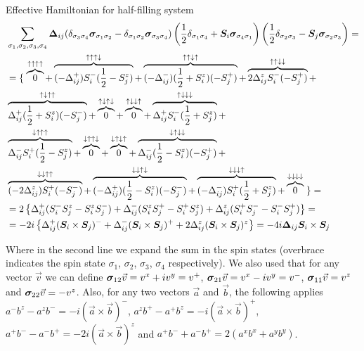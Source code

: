 \begin{section}{Effective Hamiltonian for half-filling system}
\begin{align*}
&\sum_{\sigma_1, \sigma_2, \sigma_3, \sigma_4}\boldsymbol{\Delta}_{ij}(\delta_{\sigma_3 \sigma_4}\boldsymbol{\sigma}_{\sigma_1 \sigma_2} - \delta_{\sigma_1 \sigma_2} \boldsymbol{\sigma}_{\sigma_3\sigma_4})\left(\frac{1}{2}\delta_{\sigma_1 \sigma_4} + \boldsymbol{S}_i\boldsymbol{\sigma}_{\sigma_4 \sigma_1}\right)\left(\frac{1}{2}\delta_{\sigma_2 \sigma_3}-\boldsymbol{S}_j\boldsymbol{\sigma}_{\sigma_2 \sigma_3}\right) = \\
 &= \left\{ \right.
	\overbrace{0}^{\uparrow \uparrow \uparrow \uparrow} +
	\overbrace{(-\Delta_{ij}^+)S_i^-(\frac{1}{2}-S_j^z)}^{\uparrow \uparrow \uparrow \downarrow} +
	\overbrace{(-\Delta_{ij}^-)(\frac{1}{2}+ S_i^z)(-S_j^+)}^{\uparrow \uparrow \downarrow \uparrow} +
	\overbrace{2\Delta_{ij}^z S_i^-(-S_j^+)}^{\uparrow \uparrow \downarrow \downarrow} + \\
	&\overbrace{\Delta_{ij}^+ (\frac{1}{2}+S_i^z)(-S_j^-)}^{\uparrow \downarrow \uparrow \uparrow} +
	\overbrace{0}^{\uparrow \downarrow \uparrow \downarrow} +
	\overbrace{0}^{\uparrow \downarrow \downarrow \uparrow} +
	\overbrace{\Delta_{ij}^+ S_i^-(\frac{1}{2}+S_j^z)}^{\uparrow \downarrow \downarrow \downarrow} + \\
	&\overbrace{\Delta_{ij}^- S_i^+(\frac{1}{2}-S_j^z)}^{\downarrow \uparrow \uparrow \uparrow} +
	\overbrace{0}^{\downarrow \uparrow \uparrow \downarrow} +
	\overbrace{0}^{\downarrow \uparrow \downarrow \uparrow} +
	\overbrace{\Delta_{ij}^- (\frac{1}{2} - S_i^z) (-S_j^+)}^{\downarrow \uparrow \downarrow \downarrow} + \\
	& \overbrace{(-2\Delta_{ij}^z)S_i^+(-S_j^-)}^{\downarrow \downarrow \uparrow \uparrow} +
	\overbrace{(-\Delta_{ij}^+) (\frac{1}{2}-S_i^z)(-S_j^-)}^{\downarrow \downarrow \uparrow \downarrow} +
	\overbrace{(-\Delta_{ij}^-) S_i^+(\frac{1}{2}+S_j^z)}^{\downarrow \downarrow \downarrow \uparrow} +
	\overbrace{0}^{\downarrow \downarrow \downarrow \downarrow}
\left. \right\} = \\
&= 2\left\{ \Delta_{ij}^+ (S_i^-S_j^z - S_i^zS_j^-) + \Delta_{ij}^- (S_i^zS_j^+ - S_i^+S_j^z) + \Delta_{ij}^z (S_i^+S_j^- - S_i^-S_j^+) \right\} = \\
&= -2i\left\{ \Delta_{ij}^+ (\boldsymbol{S}_i\times\boldsymbol{S}_j)^- + \Delta_{ij}^- (\boldsymbol{S}_i\times\boldsymbol{S}_j)^+ + 2\Delta_{ij}^z (\boldsymbol{S}_i\times\boldsymbol{S}_j)^z \right\} = -4i \boldsymbol{\Delta}_{ij} \boldsymbol{S}_i \times \boldsymbol{S}_j 
\end{align*}

Where in the second line we expand the sum in the spin states (overbrace indicates the spin state $\sigma_1$, $\sigma_2$, $\sigma_3$, $\sigma_4$ respectively). We also used that for any vector $\vec{v}$ we can define $\boldsymbol{\sigma}_{12}\vec{v} = v^x+iv^y = v^+$, $\boldsymbol{\sigma}_{21}\vec{v} = v^x-iv^y = v^-$, $\boldsymbol{\sigma}_{11}\vec{v} = v^z$ and $\boldsymbol{\sigma}_{22}\vec{v} = -v^z$. Also, for any two vectors $\vec{a}$ and $\vec{b}$, the following applies $a^-b^z-a^zb^- = -i(\vec{a}\times\vec{b})^-$, $a^zb^+-a^+b^z=-i(\vec{a}\times\vec{b})^+$, $a^+b^--a^-b^+=-2i(\vec{a}\times \vec{b})^z$ and $a^+b^-+a^-b^+=2(a^xb^x+a^yb^y)$.


\end{section}
